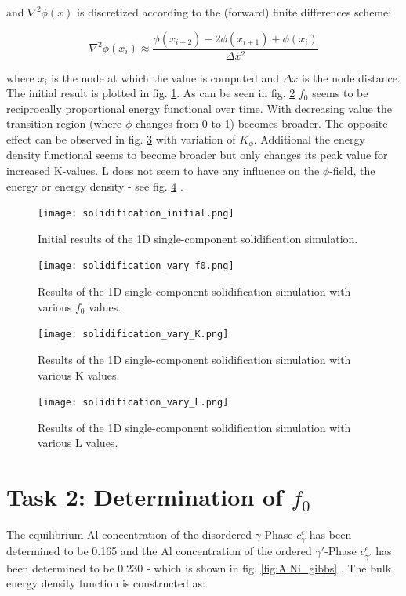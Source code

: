 and \(\nabla^{2} \phi(x) \) is discretized according to the (forward) finite differences scheme:

\begin{equation}
	\nabla^{2} \phi(x_{i}) \approx \frac{\phi(x_{i+2}) - 2\phi(x_{i+1}) + \phi(x_{i}) }{\Delta x^{2}} \label{eq:forward_euler_second_derivative}
\end{equation}

where \(x_{i}\) is the node at which the value is computed and \(\Delta x\) is the node distance. The initial result is plotted in fig. \ref{fig:solidification_init}. As can be seen in fig. \ref{fig:solidification_f0} \(f_{0}\) seems to be reciprocally proportional energy functional over time. With decreasing value the transition region (where \(\phi\) changes from 0 to 1) becomes broader. The opposite effect can be observed in fig. \ref{fig:solidification_K} with variation of \(K_{\phi}\). Additional the energy density functional seems to become broader but only changes its peak value for increased K-values. L does not seem to have any influence on the \(\phi\)-field, the energy or energy density - see fig. \ref{fig:solidification_L} .


\begin{figure}[htb]
	\centering
	\texttt{[image: solidification\_initial.png]}
	\caption{Initial results of the 1D single-component solidification simulation.}
	\label{fig:solidification_init}
\end{figure}

\begin{figure}[htb]
	\centering
	\texttt{[image: solidification\_vary\_f0.png]}
	\caption{Results of the 1D single-component solidification simulation with various \(f_{0}\) values.}
	\label{fig:solidification_f0}
\end{figure}

\begin{figure}[htb]
	\centering
	\texttt{[image: solidification\_vary\_K.png]}
	\caption{Results of the 1D single-component solidification simulation with various K values.}
	\label{fig:solidification_K}
\end{figure}


\begin{figure}[htb]
	\centering
	\texttt{[image: solidification\_vary\_L.png]}
	\caption{Results of the 1D single-component solidification simulation with various L values.}
	\label{fig:solidification_L}
\end{figure}

\section{Task 2: Determination of \(f_{0}\)}
The equilibrium Al concentration of the disordered \(\gamma \)-Phase \(c_{\gamma}^{e}\) has been determined to be 0.165 and the  Al concentration of the ordered \(\gamma ' \)-Phase \(c_{\gamma '}^{e}\) has been determined to be 0.230 - which is shown in fig. \ref{fig:AlNi_gibbs} \cite{zhu2002}. The bulk energy density function is constructed as:

